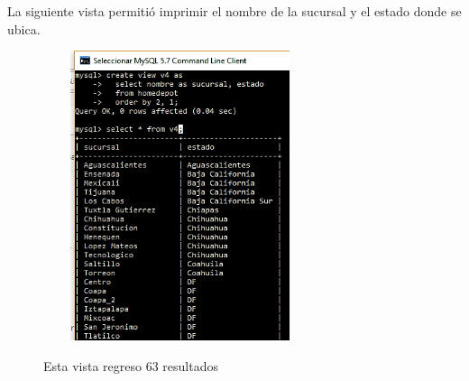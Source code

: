 \documentclass[12pt, titlepage]{article}
\begin{document}
	La siguiente vista permitió imprimir el nombre de la sucursal y el estado donde se ubica.
	\begin{figure}[H]
		\begin{center}
			\includegraphics[width=8cm, height=8.5cm]{img/v4.png}
			\label{fig:v4}
			\caption{Esta vista regreso 63 resultados}
		\end{center}
	\end{figure}
	
\end{document}
